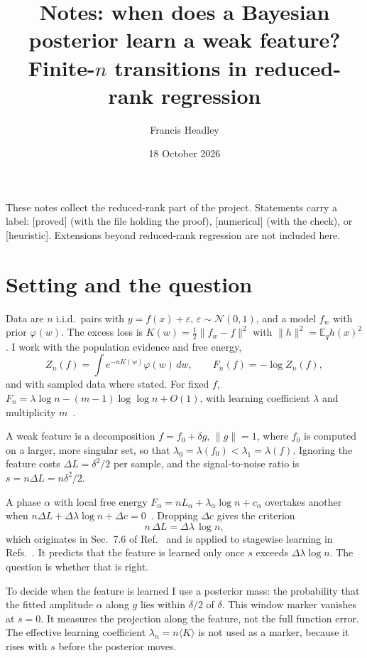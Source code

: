 \documentclass[11pt]{article}
\title{Notes: when does a Bayesian posterior learn a weak feature?\\[2pt]\large Finite-$n$ transitions in reduced-rank regression}
\author{Francis Headley}
\date{18 October 2026}
\newcommand{\E}{\mathbb{E}}
\newcommand{\status}[1]{\textsf{[#1]}}
\begin{document}
\maketitle

\noindent These notes collect the reduced-rank part of the project.
Statements carry a label: \status{proved} (with the file holding the proof), \status{numerical} (with the check), or \status{heuristic}.
Extensions beyond reduced-rank regression are not included here.

\section{Setting and the question}

Data are $n$ i.i.d.\ pairs with $y=f(x)+\varepsilon$, $\varepsilon\sim\mathcal N(0,1)$, and a model $f_w$ with prior $\varphi(w)$.
The excess loss is $K(w)=\tfrac12\lVert f_w-f\rVert^2$ with $\lVert h\rVert^2=\E_qh(x)^2$.
I work with the population evidence and free energy,
\begin{equation}
  Z_n(f)=\int e^{-nK(w)}\varphi(w)\,dw,\qquad F_n(f)=-\log Z_n(f),
  \label{eq:Z}
\end{equation}
and with sampled data where stated.
For fixed $f$, $F_n=\lambda\log n-(m-1)\log\log n+O(1)$, with learning coefficient $\lambda$ and multiplicity $m$~\cite{Wat09}.

A weak feature is a decomposition $f=f_0+\delta g$, $\lVert g\rVert=1$, where $f_0$ is computed on a larger, more singular set, so that $\lambda_0=\lambda(f_0)<\lambda_1=\lambda(f)$.
Ignoring the feature costs $\Delta L=\delta^2/2$ per sample, and the signal-to-noise ratio is $s=n\Delta L=n\delta^2/2$.

A phase $\alpha$ with local free energy $F_\alpha=nL_\alpha+\lambda_\alpha\log n+c_\alpha$ overtakes another when $n\Delta L+\Delta\lambda\log n+\Delta c=0$~\cite{CLMWM23}.
Dropping $\Delta c$ gives the criterion
\begin{equation}
  n\,\Delta L=\Delta\lambda\,\log n ,
  \label{eq:rule}
\end{equation}
which originates in Sec.~7.6 of Ref.~\cite{Wat09} and is applied to stagewise learning in Refs.~\cite{CHFM25,LUWMW25}.
It predicts that the feature is learned only once $s$ exceeds $\Delta\lambda\log n$.
The question is whether that is right.

To decide when the feature is learned I use a posterior mass: the probability that the fitted amplitude $\alpha$ along $g$ lies within $\delta/2$ of $\delta$.
This window marker vanishes at $s=0$.
It measures the projection along the feature, not the full function error.
The effective learning coefficient $\lambda_n=n\langle K\rangle$ is not used as a marker, because it rises with $s$ before the posterior moves.
\end{document}
